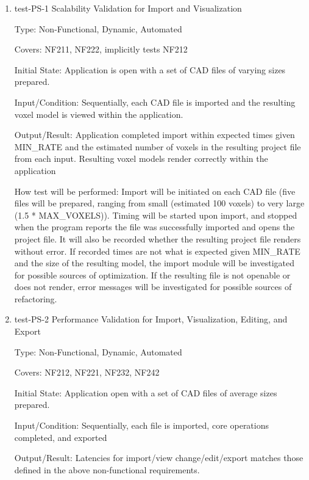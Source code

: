 \documentclass[12pt, titlepage]{article}
\begin{document}
\begin{enumerate}

\item{test-PS-1 Scalability Validation for Import and Visualization\\}

Type: Non-Functional, Dynamic, Automated

Covers: NF211, NF222, implicitly tests NF212
					
Initial State: Application is open with a set of CAD files of varying sizes prepared.
					
Input/Condition: Sequentially, each CAD file is imported and the resulting voxel model is viewed within the application. 
					
Output/Result: Application completed import within expected times given MIN\_RATE and the estimated number of voxels in the resulting project
file from each input. Resulting voxel models render correctly within the application
					
How test will be performed: Import will be initiated on each CAD file (five files will be prepared, ranging from small (estimated 
100 voxels) to very large (1.5 * MAX\_VOXELS)). Timing will be started upon import, and stopped when the program reports the file was 
successfully imported and opens the project file. It will also be recorded whether the resulting project file renders without error.
If recorded times are not what is expected given MIN\_RATE and the size of the
resulting model, the import module will be investigated for possible sources of optimization. If the resulting file is not openable or does
not render, error messages will be investigated for possible sources of refactoring. %
					
\item{test-PS-2 Performance Validation for Import, Visualization, Editing, and Export\\}

Type: Non-Functional, Dynamic, Automated

Covers: NF212, NF221, NF232, NF242
					
Initial State: Application open with a set of CAD files of average sizes prepared.
					
Input/Condition: Sequentially, each file is imported, core operations completed, and exported
					
Output/Result: Latencies for import/view change/edit/export matches those defined in the above non-functional requirements.
					

\end{enumerate}
\end{document}
